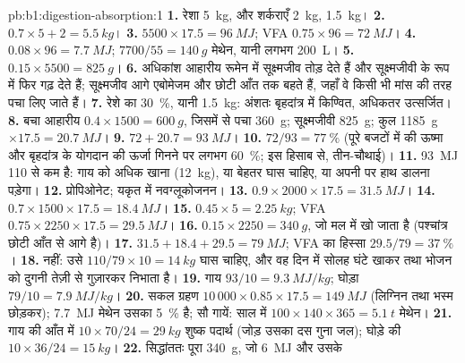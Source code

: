 \begin{solution}{pb:b1:digestion-absorption:1}
\textbf{1.} रेशा \qty{5}{kg},  और शर्कराएँ \qty{2}{kg}, 
\qty{1.5}{kg}।
\textbf{2.} $0.7\times 5 + 2 = \qty{5.5}{kg}$।
\textbf{3.} $5500\times 17.5 = \qty{96}{MJ}$; VFA $0.75\times 96 =
\qty{72}{MJ}$।
\textbf{4.} $0.08\times 96 = \qty{7.7}{MJ}$; $7700/55 = \qty{140}{g}$
मेथेन, यानी लगभग \qty{200}{L}।
\textbf{5.} $0.15\times 5500 = \qty{825}{g}$।
\textbf{6.} अधिकांश आहारीय  रूमेन में सूक्ष्मजीव तोड़ देते हैं और
सूक्ष्मजीवी  के रूप में फिर गढ़ देते हैं; सूक्ष्मजीव आगे
एबोमेजम और छोटी आँत तक बहते हैं, जहाँ वे किसी भी मांस की तरह पचा लिए जाते हैं।
\textbf{7.} रेशे का \qty{30}{\%}, यानी \qty{1.5}{kg}: अंशतः
बृहदांत्र में किण्वित, अधिकतर उत्सर्जित।
\textbf{8.} बचा आहारीय  $0.4\times 1500 = \qty{600}{g}$,
जिसमें से पचा \qty{360}{g}; सूक्ष्मजीवी \qty{825}{g}; कुल \qty{1185}{g}
$\times 17.5 = \qty{20.7}{MJ}$।
\textbf{9.} $72 + 20.7 = \qty{93}{MJ}$।
\textbf{10.} $72/93 = \qty{77}{\%}$ (पूरे बजटों में  की ऊष्मा और
बृहदांत्र के योगदान की ऊर्जा गिनने पर लगभग \qty{60}{\%}; इस हिसाब से,
तीन-चौथाई)।
\textbf{11.} \qty{93}{MJ} \qty{110}{} से कम है: गाय को अधिक खाना
(\qty{12}{kg}), या बेहतर घास चाहिए, या अपनी  पर हाथ डालना पड़ेगा।
\textbf{12.} प्रोपिओनेट; यकृत में नवग्लूकोजनन।
\textbf{13.} $0.9\times 2000\times 17.5 = \qty{31.5}{MJ}$।
\textbf{14.} $0.7\times 1500\times 17.5 = \qty{18.4}{MJ}$।
\textbf{15.} $0.45\times 5 = \qty{2.25}{kg}$; VFA $0.75\times 2250\times
17.5 = \qty{29.5}{MJ}$।
\textbf{16.} $0.15\times 2250 = \qty{340}{g}$, जो मल में खो जाता है
(पश्चांत्र छोटी आँत से आगे है)।
\textbf{17.} $31.5 + 18.4 + 29.5 = \qty{79}{MJ}$; VFA का हिस्सा $29.5/79 =
\qty{37}{\%}$।
\textbf{18.} नहीं: उसे $110/79\times 10 = \qty{14}{kg}$ घास चाहिए, और
वह दिन में सोलह घंटे खाकर तथा भोजन को दुगनी तेज़ी से गुज़ारकर निभाता है।
\textbf{19.} गाय $93/10 = \qty{9.3}{MJ/kg}$; घोड़ा $79/10 =
\qty{7.9}{MJ/kg}$।
\textbf{20.} सकल ग्रहण $10\,000\times 0.85\times 17.5 =
\qty{149}{MJ}$ (लिग्निन तथा भस्म छोड़कर); \qty{7.7}{MJ} मेथेन उसका
\qty{5}{\%} है; सौ गायें: साल में $100\times 140\times 365 =
\qty{5.1}{t}$ मेथेन।
\textbf{21.} गाय की आँत में $10\times 70/24 = \qty{29}{kg}$ शुष्क पदार्थ
(जोड़ उसका दस गुना जल); घोड़े की $10\times 36/24 =
\qty{15}{kg}$।
\textbf{22.} सिद्धांततः पूरा \qty{340}{g}, जो \qty{6}{MJ} और उसके

\end{solution}

